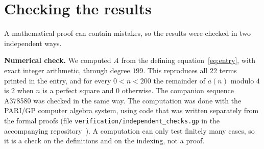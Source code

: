 \documentclass[11pt,a4paper]{article}
\theoremstyle{definition}
\theoremstyle{remark}
\newcommand{\para}[1]{\par\medskip\noindent\textbf{#1}\enspace}
\begin{document}
\section{Checking the results}\label{sec:checks}

A mathematical proof can contain mistakes, so the results were checked in two independent ways.

\para{Numerical check.}
We computed $A$ from the defining equation~\eqref{eq:entry}, with exact integer arithmetic, through degree
$199$. This reproduces all 22 terms printed in the entry, and for every $0<n<200$ the remainder of
$a(n)$ modulo $4$ is $2$ when $n$ is a perfect square and $0$ otherwise. The companion sequence A378580 was
checked in the same way.
The computation was done with the PARI/GP computer algebra system, using code that was written separately from the
formal proofs (file \texttt{verification/independent\_checks.gp} in the accompanying repository~\cite{repo}).
A computation can only test finitely many cases, so it is a check on the definitions and on the indexing, not a proof.
\end{document}
